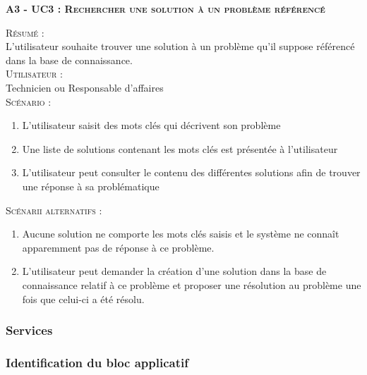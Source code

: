 \noindent\textsc{\bf{A3 - UC3 :} Rechercher une solution à un problème référencé}
\begin{shaded}
\noindent\textsc{Résumé :}\\

L’utilisateur souhaite trouver une solution à un problème qu’il suppose référencé dans la base de connaissance. \\

\noindent\textsc{Utilisateur :} \\

Technicien ou Responsable d’affaires \\

\noindent\textsc{Scénario :} \\
\begin{enumerate}
    \item L’utilisateur saisit des mots clés qui décrivent son problème
    \item Une liste de solutions contenant les mots clés est présentée à l’utilisateur
    \item L’utilisateur peut consulter le contenu des différentes solutions afin de trouver une réponse à sa problématique \\
\end{enumerate}
\noindent\textsc{Scénarii alternatifs :}\\
\begin{enumerate}
    \item Aucune solution ne comporte les mots clés saisis et le système ne connaît apparemment pas de réponse à ce problème.
    \item L’utilisateur peut demander la création d’une solution dans la base de connaissance relatif à ce problème et proposer une résolution au problème une fois que celui-ci a été résolu.
\end{enumerate}
\end{shaded}

\subsubsection{Services}


\subsubsection{Identification du bloc applicatif}


